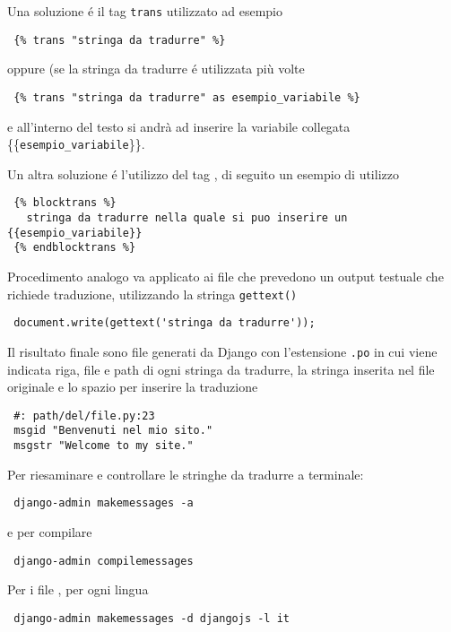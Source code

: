 Una soluzione é il tag \texttt{trans} utilizzato ad esempio
\begin{footnotesize}
\begin{verbatim}
 {% trans "stringa da tradurre" %}
\end{verbatim}
\end{footnotesize}
oppure (se la stringa da tradurre é utilizzata più volte
\begin{footnotesize}
\begin{verbatim}
 {% trans "stringa da tradurre" as esempio_variabile %}
\end{verbatim}
\end{footnotesize}
e all'interno del testo si andrà ad inserire la variabile collegata \{\{\texttt{esempio\_variabile}\}\}.

Un altra soluzione é l'utilizzo del tag , di seguito un esempio di utilizzo
\begin{footnotesize}
\begin{verbatim}
 {% blocktrans %} 
   stringa da tradurre nella quale si puo inserire un {{esempio_variabile}}
 {% endblocktrans %}
\end{verbatim}
\end{footnotesize}

Procedimento analogo va applicato ai file {\js} che prevedono un output testuale che richiede traduzione, utilizzando la stringa \texttt{gettext()}
\begin{footnotesize}
\begin{verbatim}
 document.write(gettext('stringa da tradurre'));
\end{verbatim}
\end{footnotesize}

Il risultato finale sono file generati da Django con l'estensione \texttt{.po} in cui viene indicata riga, file e path di ogni stringa da tradurre, la stringa inserita nel file originale e lo spazio per inserire la traduzione
\begin{footnotesize}
\begin{verbatim}
 #: path/del/file.py:23
 msgid "Benvenuti nel mio sito."
 msgstr "Welcome to my site."
\end{verbatim}
\end{footnotesize}

Per riesaminare e controllare le stringhe da tradurre a terminale:
\begin{footnotesize}
\begin{verbatim}
 django-admin makemessages -a
\end{verbatim}
\end{footnotesize}
e per compilare
\begin{footnotesize}
\begin{verbatim}
 django-admin compilemessages
\end{verbatim}
\end{footnotesize}

Per i file {\js}, per ogni lingua
\begin{footnotesize}
\begin{verbatim}
 django-admin makemessages -d djangojs -l it
\end{verbatim}
\end{footnotesize}
